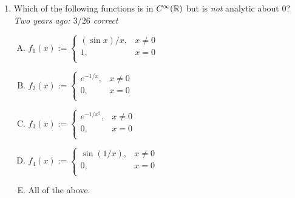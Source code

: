 \documentclass[10pt]{amsart}
\begin{document}
\begin{enumerate}
  {\em Explanation}: A piecewise description of $f$ is:

  $$f(x) := \left \lbrace \begin{array}{rr} x, & x > 0 \\ 0, & x \le 0 \\\end{array}\right.$$

  The Taylor series is not defined at $0$. The
  reason is that the function is not differentiable at $0$, because
  the left hand derivative $f'_-(0)$ is $0$ and the right hand
  derivative $f'_+(0)$ is $1$.

  At any other point, the Taylor series corresponds globally to the
  piece function for that point. So, the Taylor series at any positive
  real number is just the $x$ function and the Taylor series at any
  negative real number is just the $0$ function. This ties in with the
  idea that the Taylor series is completely determined by the local
  behavior of the function and cannot see changes in the function
  definition far from the point.

  {\em Performance review}: $19$ out of $24$ got this. $2$ each chose
  (B) and (C), $1$ chose (A).

  {\em Historical note (Math 153)}: $26$ out of $40$ got this. $6$ chose (C),
  $4$ chose (D), $3$ chose (A), $1$ chose (B).

\item Which of the following functions is in $C^\infty(\mathbb{R})$ but is
  {\em not} analytic about $0$? {\em Two years ago: $3/26$ correct}

  \begin{enumerate}[(A)]
  \item $f_1(x) := \left \lbrace \begin{array}{rl} (\sin x)/x, & x \ne 0\\ 1, & x = 0 \\\end{array} \right.$
  \item $f_2(x) := \left \lbrace \begin{array}{rl} e^{-1/x}, & x \ne 0\\ 0, & x = 0 \\\end{array} \right.$
  \item $f_3(x) := \left \lbrace \begin{array}{rl} e^{-1/x^2}, & x \ne 0\\ 0, & x = 0 \\\end{array} \right.$
  \item $f_4(x) := \left \lbrace \begin{array}{rl} \sin(1/x), & x \ne 0 \\ 0, & x = 0 \\\end{array} \right.$
  \item All of the above.
  \end{enumerate}


\end{enumerate}
\end{document}
